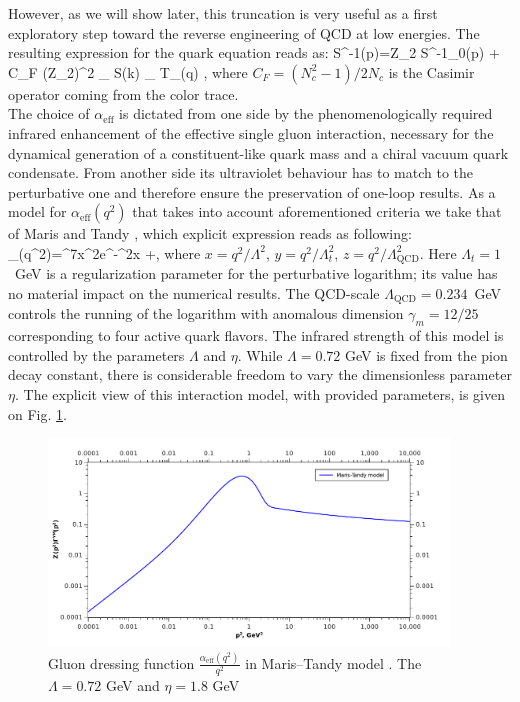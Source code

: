 However, as we will show later, this truncation is very useful as a first exploratory step toward the reverse engineering of QCD at low energies. The resulting expression for the quark \DS equation reads as:
\beqa
\displaystyle S^{-1}(p)=Z_2 S^{-1}_0(p) + C_F (Z_2)^2 \int {} \gamma_{\mu} S(k) \gamma_{\nu} T_{\mu\nu}(q) \;,
\label{dse:DSE_RL}
\eeqa
where $C_F=(N_c^2-1)/2N_c$ is the Casimir operator coming from the color trace. \\

The choice of $\alpha_{\mathrm{eff}}$ is dictated from one side by the phenomenologically
required infrared enhancement of the effective single gluon interaction, necessary for the dynamical 
generation of a constituent-like quark mass and a chiral vacuum quark condensate. From another side its ultraviolet behaviour has to match to the perturbative one and therefore ensure the preservation of one-loop results. As a model for $\alpha_{\mathrm{eff}}(q^2)$ that takes into account aforementioned criteria we take that of Maris and Tandy \cite{Maris:1999nt}, which explicit expression reads as following:
\beqa
\label{dse:MT_model}
\alpha_{}(q^2)=\pi\eta^7x^2e^{-\eta^2x}
+\;,
\eeqa
where $x=q^2/\Lambda^2$, $y=q^2/\Lambda_t^2$, $z=q^2/\Lambda_{\mathrm{QCD}}^2$. 
Here $\Lambda_t=1$~GeV is a regularization parameter for the perturbative logarithm;
its value has no material impact on the numerical results. The QCD-scale 
$\Lambda_{\mathrm{QCD}}=0.234$~GeV controls the running of the logarithm with
anomalous dimension $\gamma_m=12/25$ corresponding to four active quark flavors.
The infrared strength of this model is controlled by the parameters $\Lambda$ and 
$\eta$. While $\Lambda = 0.72$ GeV is fixed from the pion decay constant, there is considerable
freedom to vary the dimensionless parameter $\eta$. The explicit view of this interaction model, with provided parameters, is given on Fig. \ref{fig:MT_graph}. 
\begin{figure}[t]
\tiny
 \begin{center}
  \includegraphics[width=0.95\textwidth]{figures/Gluon_MT_graph}
 \end{center}
 \caption{\footnotesize Gluon dressing function $\frac{\alpha_{\mathrm{eff}}(q^2)}{q^2}$ in Maris--Tandy model \cite{Maris:1999nt}. The $\Lambda = 0.72$ GeV and $\eta = 1.8$ GeV }\label{fig:MT_graph} 
\end{figure} \\

